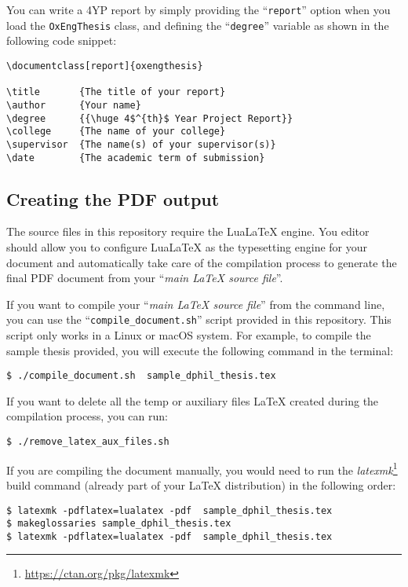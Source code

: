 You can write a 4YP report by simply providing the ``\verb|report|'' option when you load the \verb|OxEngThesis| class, and defining the ``\verb|degree|'' variable as shown in  the
following code snippet:


\begin{lstlisting}[style=custom-latex]
\documentclass[report]{oxengthesis}

\title       {The title of your report}
\author      {Your name}
\degree      {{\huge 4$^{th}$ Year Project Report}}
\college     {The name of your college}
\supervisor  {The name(s) of your supervisor(s)}
\date        {The academic term of submission}
\end{lstlisting}


\subsection{Creating the PDF output}


The source files in this repository require the LuaLaTeX engine. You editor should allow you to configure LuaLaTeX as the typesetting engine for your document and automatically take care of the compilation process to generate the final PDF document from your ``\textit{main LaTeX source file}''.

If you want to compile your ``\textit{main LaTeX source file}'' from the command line, you can use the ``\verb|compile_document.sh|'' script provided in this repository. This script only works in a Linux or macOS system. For example, to compile the sample thesis provided, you will execute the following command in the terminal:


\begin{lstlisting}[style=custom-bash]
$ ./compile_document.sh  sample_dphil_thesis.tex
\end{lstlisting}

If you want to delete all the temp or auxiliary files LaTeX created during the compilation process, you can run:

\begin{lstlisting}[style=custom-bash]
$ ./remove_latex_aux_files.sh
\end{lstlisting}


If you are compiling the document manually, you would need to run the \textit{latexmk}\footnote{\url{https://ctan.org/pkg/latexmk}} build command (already part of your LaTeX distribution) in the following order:

\begin{lstlisting}[style=custom-bash]
$ latexmk -pdflatex=lualatex -pdf  sample_dphil_thesis.tex
$ makeglossaries sample_dphil_thesis.tex
$ latexmk -pdflatex=lualatex -pdf  sample_dphil_thesis.tex
\end{lstlisting}


